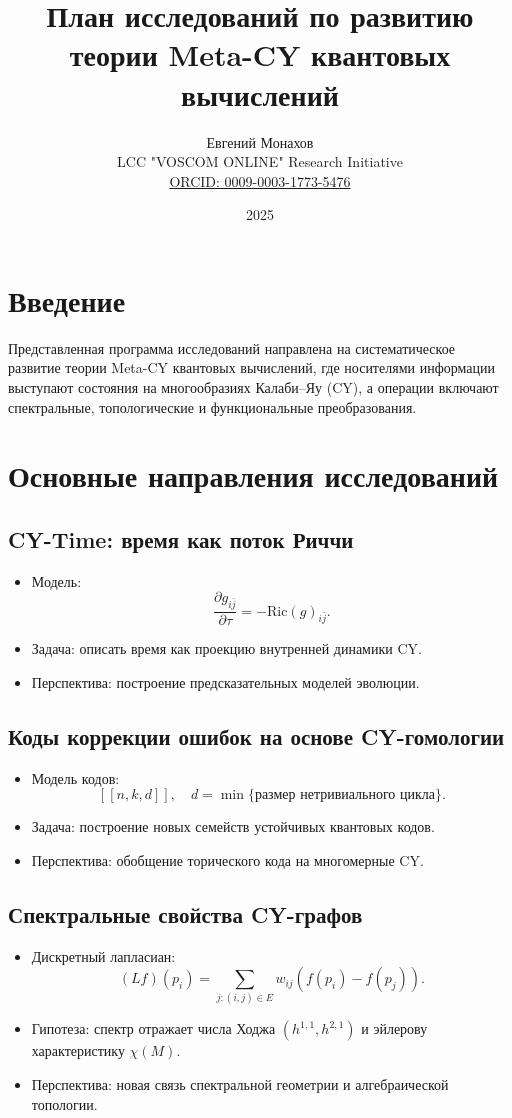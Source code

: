 \documentclass[12pt,a4paper]{article}
\title{План исследований по развитию теории Meta-CY квантовых вычислений}
\author{Евгений Монахов \\ LCC "VOSCOM ONLINE" Research Initiative \\ 
\href{https://orcid.org/0009-0003-1773-5476}{ORCID: 0009-0003-1773-5476}}
\date{2025}
\begin{document}
\maketitle

\section*{Введение}
Представленная программа исследований направлена на систематическое развитие теории
Meta-CY квантовых вычислений, где носителями информации выступают состояния на многообразиях Калаби--Яу (CY),
а операции включают спектральные, топологические и функциональные преобразования.  

\section{Основные направления исследований}

\subsection{CY-Time: время как поток Риччи}
\begin{itemize}
\item Модель: 
\[
\frac{\partial g_{i\bar{j}}}{\partial \tau} = - \mathrm{Ric}(g)_{i\bar{j}}.
\]
\item Задача: описать время как проекцию внутренней динамики CY.  
\item Перспектива: построение предсказательных моделей эволюции.  
\end{itemize}

\subsection{Коды коррекции ошибок на основе CY-гомологии}
\begin{itemize}
\item Модель кодов:
\[
[[n,k,d]], \quad d = \min\{\text{размер нетривиального цикла}\}.
\]
\item Задача: построение новых семейств устойчивых квантовых кодов.  
\item Перспектива: обобщение торического кода на многомерные CY.  
\end{itemize}

\subsection{Спектральные свойства CY-графов}
\begin{itemize}
\item Дискретный лапласиан:
\[
(Lf)(p_i) = \sum_{j:(i,j)\in E} w_{ij}(f(p_i)-f(p_j)).
\]
\item Гипотеза: спектр отражает числа Ходжа $(h^{1,1},h^{2,1})$ и эйлерову характеристику $\chi(M)$.  
\item Перспектива: новая связь спектральной геометрии и алгебраической топологии.  
\end{itemize}
\end{document}
